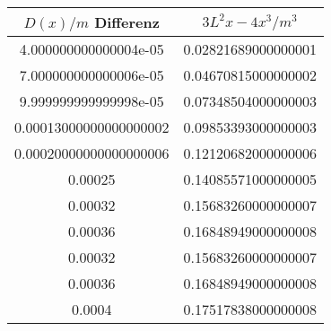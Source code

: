 \begin{table}\caption{}
\label{}
\centering
{}
\begin{tabular}{S[]S[]} 
\toprule
{$D(x)/m$ Differenz} & {$3L^2x-4x^3 /m^3$}\\
\midrule
4.000000000000004e-05 & 0.02821689000000001\\
7.000000000000006e-05 & 0.04670815000000002\\
9.999999999999998e-05 & 0.07348504000000003\\
0.00013000000000000002 & 0.09853393000000003\\
0.00020000000000000006 & 0.12120682000000006\\
0.00025 & 0.14085571000000005\\
0.00032 & 0.15683260000000007\\
0.00036 & 0.16848949000000008\\
0.00032 & 0.15683260000000007\\
0.00036 & 0.16848949000000008\\
0.0004 & 0.17517838000000008\\
\bottomrule
\end{tabular}\end{table}